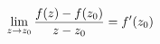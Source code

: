 \documentclass[preview]{standalone}
\begin{document}
\begin{align*}
\special{dvisvgm:raw <g id='unique000'>}\lim_{z \to z_0} \frac{f(z) - f(z_0)}{z - z_0} = f'(z_0)\special{dvisvgm:raw </g>}
\end{align*}
\end{document}

